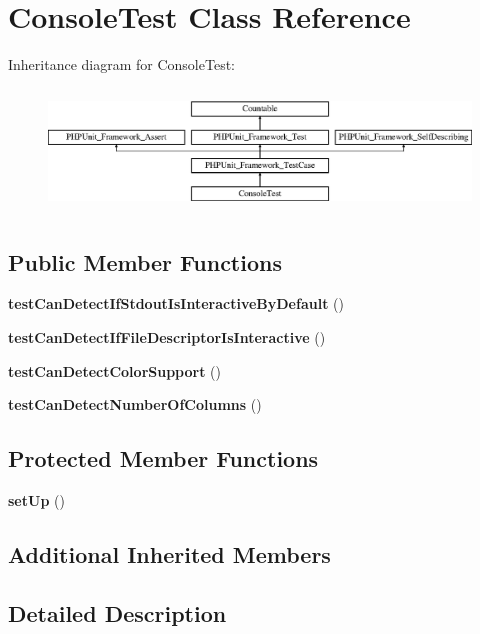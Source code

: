 \section{Console\+Test Class Reference}
\label{class_sebastian_bergmann_1_1_environment_1_1_console_test}
Inheritance diagram for Console\+Test\+:\begin{figure}[H]
\begin{center}
\leavevmode
\includegraphics[height=3.303835cm]{class_sebastian_bergmann_1_1_environment_1_1_console_test}
\end{center}
\end{figure}
\subsection*{Public Member Functions}
\begin{DoxyCompactItemize}
\item 
{\bf test\+Can\+Detect\+If\+Stdout\+Is\+Interactive\+By\+Default} ()
\item 
{\bf test\+Can\+Detect\+If\+File\+Descriptor\+Is\+Interactive} ()
\item 
{\bf test\+Can\+Detect\+Color\+Support} ()
\item 
{\bf test\+Can\+Detect\+Number\+Of\+Columns} ()
\end{DoxyCompactItemize}
\subsection*{Protected Member Functions}
\begin{DoxyCompactItemize}
\item 
{\bf set\+Up} ()
\end{DoxyCompactItemize}
\subsection*{Additional Inherited Members}


\subsection{Detailed Description}


